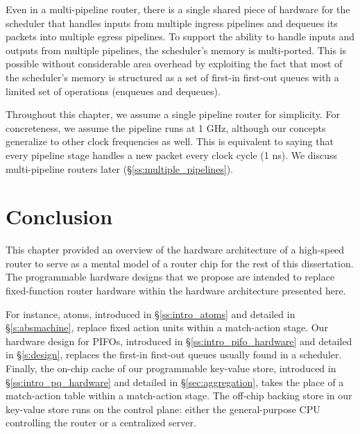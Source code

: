 Even in a multi-pipeline router, there is a single shared piece of hardware for
the scheduler that handles inputs from multiple ingress pipelines and dequeues
its packets into multiple egress pipelines. To support the ability to handle
inputs and outputs from multiple pipelines, the scheduler's memory is
multi-ported.  This is possible without considerable area overhead by
exploiting the fact that most of the scheduler's memory is structured as a set
of first-in first-out queues with a limited set of operations (\eg enqueues and
dequeues).  

Throughout this chapter, we assume a single pipeline router for simplicity. For
concreteness, we assume the pipeline runs at 1 GHz, although our concepts
generalize to other clock frequencies as well. This is equivalent to saying
that every pipeline stage handles a new packet every clock cycle (1 ns). We
discuss multi-pipeline routers later (\S\ref{ss:multiple_pipelines}). 

\section{Conclusion}
This chapter provided an overview of the hardware architecture of a high-speed
router to serve as a mental model of a router chip for the rest of this
dissertation.  The programmable hardware designs that we propose are intended
to replace fixed-function router hardware within the hardware architecture
presented here.

For instance, atoms, introduced in \S\ref{ss:intro_atoms} and detailed in
\S\ref{s:absmachine}, replace fixed action units within a match-action stage.
Our hardware design for PIFOs, introduced in \S\ref{ss:intro_pifo_hardware} and
detailed in \S\ref{s:design}, replaces the first-in first-out queues usually
found in a scheduler. Finally, the on-chip cache of our programmable key-value
store, introduced in \S\ref{ss:intro_pq_hardware} and detailed in
\S\ref{sec:aggregation}, takes the place of a match-action table within a
match-action stage. The off-chip backing store in our key-value store runs on
the control plane: either the general-purpose CPU controlling the router or a
centralized server. 
